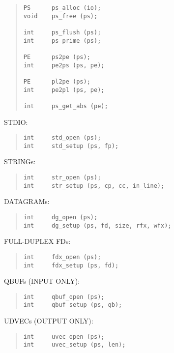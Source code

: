 \begin{bwslide}

\begin{quote}\small\begin{verbatim}
PS      ps_alloc (io);
void    ps_free (ps);

int     ps_flush (ps);
int     ps_prime (ps);

PE      ps2pe (ps);
int     pe2ps (ps, pe);

PE      pl2pe (ps);
int     pe2pl (ps, pe);

int     ps_get_abs (pe);
\end{verbatim}\end{quote}
\end{bwslide}


\begin{bwslide}

\begin{nrtc}
\item   STDIO:
\begin{quote}\small\begin{verbatim}
int     std_open (ps);
int     std_setup (ps, fp);
\end{verbatim}\end{quote}

\item   STRINGs:
\begin{quote}\small\begin{verbatim}
int     str_open (ps);
int     str_setup (ps, cp, cc, in_line);
\end{verbatim}\end{quote}

\item   DATAGRAMs:
\begin{quote}\small\begin{verbatim}
int     dg_open (ps);
int     dg_setup (ps, fd, size, rfx, wfx);
\end{verbatim}\end{quote}

\item   FULL-DUPLEX FDs:
\begin{quote}\small\begin{verbatim}
int     fdx_open (ps);
int     fdx_setup (ps, fd);
\end{verbatim}\end{quote}

\item   QBUFs (INPUT ONLY):
\begin{quote}\small\begin{verbatim}
int     qbuf_open (ps);
int     qbuf_setup (ps, qb);
\end{verbatim}\end{quote}

\item   UDVECs (OUTPUT ONLY):
\begin{quote}\small\begin{verbatim}
int     uvec_open (ps);
int     uvec_setup (ps, len);
\end{verbatim}\end{quote}
\end{nrtc}
\end{bwslide}


